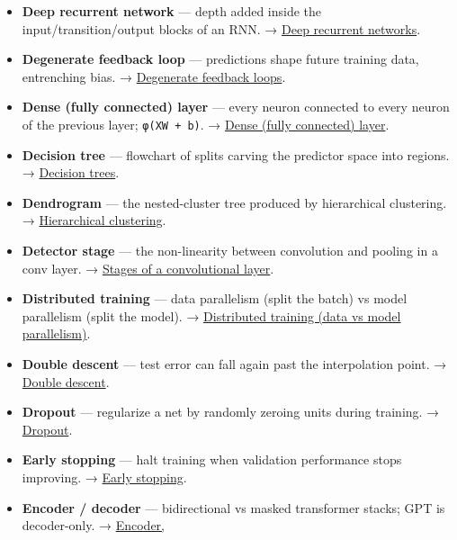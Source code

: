 \documentclass[
  10pt,
  letterpaper,
  onecolumn]{article}
\begin{document}
\begin{itemize}
  \textbf{Decoupling objectives} --- train a head per objective, combine
  scores with tunable weights. →
  \protect\hyperlink{decoupling-objectives-multi-objective-optimization}{Decoupling
  objectives (multi-objective optimization)}.
\item
  \textbf{Deep recurrent network} --- depth added inside the
  input/transition/output blocks of an RNN. →
  \protect\hyperlink{deep-recurrent-networks}{Deep recurrent networks}.
\item
  \textbf{Degenerate feedback loop} --- predictions shape future
  training data, entrenching bias. →
  \protect\hyperlink{degenerate-feedback-loops}{Degenerate feedback
  loops}.
\item
  \textbf{Dense (fully connected) layer} --- every neuron connected to
  every neuron of the previous layer; \texttt{φ(XW\ +\ b)}. →
  \protect\hyperlink{dense-fully-connected-layer}{Dense (fully
  connected) layer}.
\item
  \textbf{Decision tree} --- flowchart of splits carving the predictor
  space into regions. → \protect\hyperlink{decision-trees}{Decision
  trees}.
\item
  \textbf{Dendrogram} --- the nested-cluster tree produced by
  hierarchical clustering. →
  \protect\hyperlink{hierarchical-clustering}{Hierarchical clustering}.
\item
  \textbf{Detector stage} --- the non-linearity between convolution and
  pooling in a conv layer. →
  \protect\hyperlink{stages-of-a-convolutional-layer}{Stages of a
  convolutional layer}.
\item
  \textbf{Distributed training} --- data parallelism (split the batch)
  vs model parallelism (split the model). →
  \protect\hyperlink{distributed-training-data-vs-model-parallelism}{Distributed
  training (data vs model parallelism)}.
\item
  \textbf{Double descent} --- test error can fall again past the
  interpolation point. → \protect\hyperlink{double-descent}{Double
  descent}.
\item
  \textbf{Dropout} --- regularize a net by randomly zeroing units during
  training. → \protect\hyperlink{dropout}{Dropout}.
\item
  \textbf{Early stopping} --- halt training when validation performance
  stops improving. → \protect\hyperlink{early-stopping}{Early stopping}.
\item
  \textbf{Encoder / decoder} --- bidirectional vs masked transformer
  stacks; GPT is decoder-only. →
  \protect\hyperlink{encoder-decoder-and-cross-attention}{Encoder,
}
\end{itemize}
\end{document}
